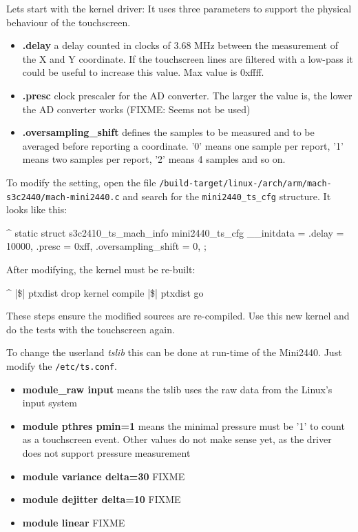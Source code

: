 Lets start with the kernel driver: It uses three parameters to support the
physical behaviour of the touchscreen.

\begin{itemize}
	\item \textbf{.delay} a delay counted in clocks of 3.68 MHz between
		the measurement of the X and Y coordinate. If the touchscreen
		lines are filtered with a low-pass it could be useful to
		increase this value. Max value is 0xffff.
	\item \textbf{.presc} clock prescaler for the AD converter. The larger the
		value is, the lower the AD converter works (FIXME: Seems not be
		used)
	\item \textbf{.oversampling\_shift} defines the samples to be measured and
		to be averaged before reporting a coordinate. '0' means one sample per
		report, '1' means two samples per report, '2' means 4 samples and
		so on.
\end{itemize}

To modify the setting, open the file
\texttt{\ptxdistPlatformDir /build-target/linux-\curKernelRev /arch/arm/mach-s3c2440/mach-mini2440.c}
and search for the \texttt{mini2440\_ts\_cfg} structure. It looks like this:

\begin{ptxshell}[escapechar=|]{^}
static struct s3c2410_ts_mach_info mini2440_ts_cfg __initdata = {
	.delay = 10000,
	.presc = 0xff,
	.oversampling_shift = 0,
};
\end{ptxshell}

After modifying, the kernel must be re-built:

\begin{ptxshell}[escapechar=|]{^}
|\$| ptxdist drop kernel compile
|\$| ptxdist go
\end{ptxshell}

These steps ensure the modified sources are re-compiled. Use this new kernel
and do the tests with the touchscreen again.

To change the userland \textit{tslib} this can be done at run-time of
the Mini2440. Just modify the \texttt{/etc/ts.conf}.

\begin{itemize}
	\item \textbf{module\_raw input} means the tslib uses the raw data from
		the Linux's input system
	\item \textbf{module pthres pmin=1} means the minimal pressure must be
		'1' to count as a touchscreen event. Other values do not make
		sense yet, as the driver does not support pressure measurement
	\item \textbf{module variance delta=30} FIXME
	\item \textbf{module dejitter delta=10} FIXME
	\item \textbf{module linear} FIXME
\end{itemize}

